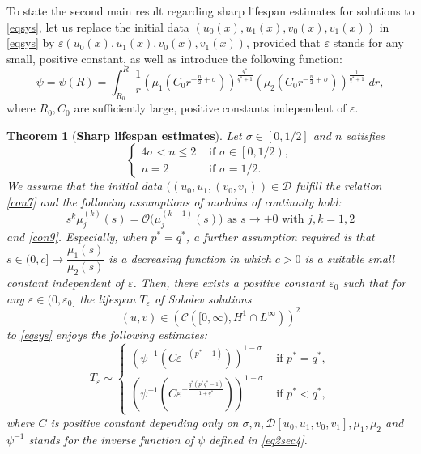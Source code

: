 \documentclass[11pt,reqno]{amsart}
\newcommand{\di}{\displaystyle}
\newcommand{\tron}[1]{\left( #1 \right)}
\numberwithin{equation}{section}
\newtheorem{theorem}{Theorem}[section]
\newcommand{\e}{\varepsilon}
\theoremstyle{plain}
\begin{document}
To state the second main result regarding sharp lifespan estimates for solutions to \eqref{eqsys}, let us replace the initial data $\left(u_0(x),u_1(x),v_0(x),v_1(x)\right)$ in \eqref{eqsys} by $\e\left(u_0(x),u_1(x),v_0(x),v_1(x)\right)$, provided that $\varepsilon$ stands for any small, positive constant, as well as introduce the following function:
    \begin{equation}\label{eq2sec4}
    \di \psi= \psi(R)=\int^{R}_{R_0}\frac{1}{r}\tron{\mu_1(C_0 r^{-\frac{n}{2}+\sigma})}^{\frac{q^*}{q^*+1}}\tron{\mu_2(C_0 r^{-\frac{n}{2}+\sigma})}^{\frac{1}{q^*+1}}\;dr,
    \end{equation}
    where $R_0,C_0$ are sufficiently large, positive constants independent of $\e$.
\begin{theorem}[\textbf{Sharp lifespan estimates}]
    Let $\sigma\in \left[0,1/2\right]$ and $n$ satisfies
    \[
    \begin{cases}
        4\sigma< n\leq 2 &\text{ if }\sigma\in \left[0,1/2\right),\\
        n=2 &\text{ if }\sigma= 1/2.
    \end{cases}
    \]
    We assume that the initial data $((u_0,u_1,(v_0,v_1))\in \mathcal{D}$ fulfill the relation \eqref{con7} and the following assumptions of modulus of continuity hold:
        \begin{equation}\label{con1thr4.1}
        s^{k}\mu^{(k)}_{j}(s)=\mathcal{O}\big(\mu^{(k-1)}_j(s)\big)\text{ as }s\to +0\text{ with }j,k=1,2
    \end{equation}
    and \eqref{con9}. Especially, when $p^*=q^*$, a further assumption required is that $s\in (0,c]\to \dfrac{\mu_1(s)}{\mu_2(s)}$ is a decreasing function in which $c>0$ is a suitable small constant independent of $\varepsilon$. Then, there exists a positive constant $\varepsilon_0$ such that for any $\varepsilon\in (0,\varepsilon_0]$ the lifespan $T_{\varepsilon}$ of Sobolev solutions
    $$ (u,v)\in \left(\mathcal{C}\left([0, \infty),H^1\cap L^{\infty}\right)\right)^2 $$
    to \eqref{eqsys} enjoys the following estimates:
    \[
    T_{\varepsilon}\sim
    \begin{cases}
    \tron{\psi^{-1}\tron{C\varepsilon^{-(p^*-1)}}}^{1-\sigma} &\text{ if $p^*=q^*$},\\
    \tron{\psi^{-1}\tron{C\varepsilon^{-\frac{q^*(p^*q^*-1)}{1+q^*}}}}^{1-\sigma} &\text{ if $p^*<q^*$},
    \end{cases}
    \]
    where $C$ is positive constant depending only on $\sigma,n,\mathcal{D}[u_0,u_1,v_0,v_1],\mu_1,\mu_2$ and $ \psi^{-1}$ stands for the inverse function of $\psi$ defined in \eqref{eq2sec4}.
\end{theorem}
\end{document}
